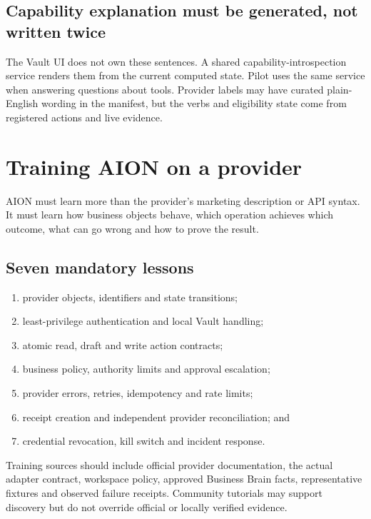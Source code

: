 \documentclass[11pt,a4paper]{article}
\begin{document}
\subsection{Capability explanation must be generated, not written twice}

The Vault UI does not own these sentences. A shared capability-introspection
service renders them from the current computed state. Pilot uses the same
service when answering questions about tools. Provider labels may have curated
plain-English wording in the manifest, but the verbs and eligibility state come
from registered actions and live evidence.

\section{Training AION on a provider}
\label{sec:training}

AION must learn more than the provider's marketing description or API syntax.
It must learn how business objects behave, which operation achieves which
outcome, what can go wrong and how to prove the result.

\subsection{Seven mandatory lessons}

\begin{enumerate}
  \item provider objects, identifiers and state transitions;
  \item least-privilege authentication and local Vault handling;
  \item atomic read, draft and write action contracts;
  \item business policy, authority limits and approval escalation;
  \item provider errors, retries, idempotency and rate limits;
  \item receipt creation and independent provider reconciliation; and
  \item credential revocation, kill switch and incident response.
\end{enumerate}

Training sources should include official provider documentation, the actual
adapter contract, workspace policy, approved Business Brain facts, representative
fixtures and observed failure receipts. Community tutorials may support
discovery but do not override official or locally verified evidence.
\end{document}
